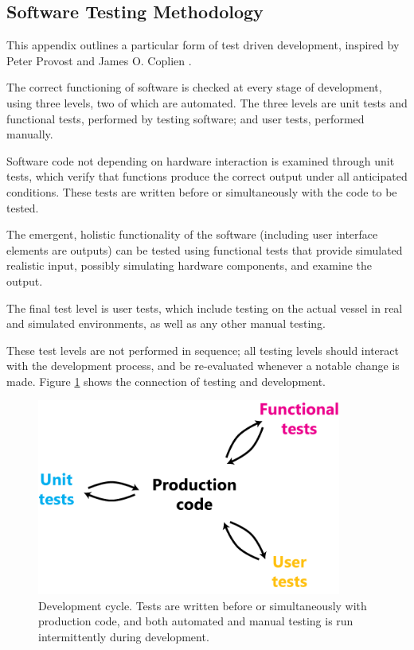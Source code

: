 \subsection{\label{app:software-testing-methodology}Software Testing Methodology}
This appendix outlines a particular form of test driven development, inspired by Peter Provost \cite{provost-tdd} and James O. Coplien \cite{coplien-tdd-waste}.

The correct functioning of software is checked at every stage of development, using three levels, two of which are automated. The three levels are unit tests and functional tests, performed by testing software; and user tests, performed manually.

Software code not depending on hardware interaction is examined through unit tests, which verify that functions produce the correct output under all anticipated conditions. These tests are written before or simultaneously with the code to be tested.

The emergent, holistic functionality of the software (including user interface elements are outputs) can be tested using functional tests that provide simulated realistic input, possibly simulating hardware components, and examine the output.

The final test level is user tests, which include testing on the actual vessel in real and simulated environments, as well as any other manual testing.

These test levels are not performed in sequence; all testing levels should interact with the development process, and be re-evaluated whenever a notable change is made. Figure \ref{fig:software-testing} shows the connection of testing and development.

\begin{figure}[h]
\includegraphics[width=100mm,natwidth=494,natheight=299]{"./image/software-testing"}
\caption[Software development cycle]{\label{fig:software-testing}Development cycle. Tests are written before or simultaneously with production code, and both automated and manual testing is run intermittently during development.}
\end{figure}
